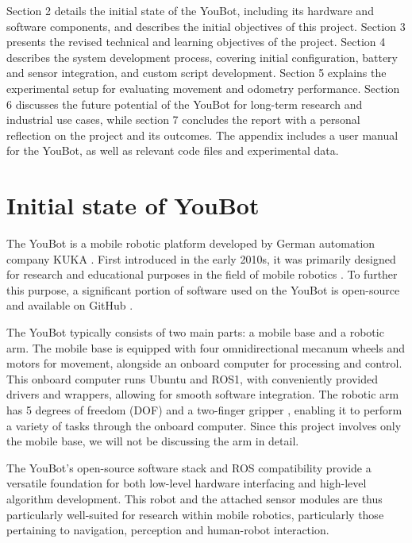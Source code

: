\documentclass[a4paper, 12pt]{article}
\begin{document}
    Section 2 details the initial state of the YouBot, including its hardware and software components, and describes the initial objectives of this project. Section 3 presents the revised technical and learning objectives of the project. Section 4 describes the system development process, covering initial configuration, battery and sensor integration, and custom script development. Section 5 explains the experimental setup for evaluating movement and odometry performance. Section 6 discusses the future potential of the YouBot for long-term research and industrial use cases, while section 7 concludes the report with a personal reflection on the project and its outcomes. The appendix includes a user manual for the YouBot, as well as relevant code files and experimental data.
    
    \pagebreak

    \section{Initial state of YouBot}

    The YouBot is a mobile robotic platform developed by German automation company KUKA \cite{KUKAYouBotFlyer}. First introduced in the early 2010s, it was primarily designed for research and educational purposes in the field of mobile robotics \cite{KUKAYouBotManual2013}. To further this purpose, a significant portion of software used on the YouBot is open-source and available on GitHub \cite{KUKAYouBotManual2013,githubYoubotOverview}.

    The YouBot typically consists of two main parts: a mobile base and a robotic arm. The mobile base is equipped with four omnidirectional mecanum wheels and motors for movement, alongside an onboard computer for processing and control. This onboard computer runs Ubuntu and ROS1, with conveniently provided drivers and wrappers, allowing for smooth software integration. The robotic arm has 5 degrees of freedom (DOF) and a two-finger gripper \cite{KUKAYouBotManual2013}, enabling it to perform a variety of tasks through the onboard computer. Since this project involves only the mobile base, we will not be discussing the arm in detail.

    The YouBot's open-source software stack and ROS compatibility provide a versatile foundation for both low-level hardware interfacing and high-level algorithm development. This robot and the attached sensor modules are thus particularly well-suited for research within mobile robotics, particularly those pertaining to navigation, perception and human-robot interaction. 
\end{document}
